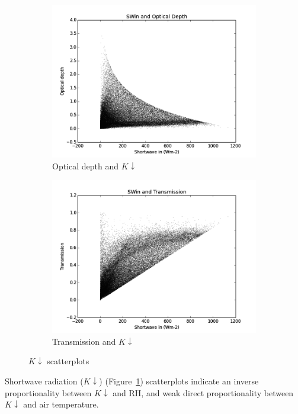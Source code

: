 \documentclass[a4paper,titlepage, twoside]{report}
\newcommand\Kdown{K\!\!\downarrow}
\begin{document}
\begin{figure}
\begin{subfigure}{0.48\textwidth}
\includegraphics[width=\textwidth]{012_SWin_tau.png}
\caption{Optical depth and $\Kdown$}
\end{subfigure}
\hfill
\begin{subfigure}{0.48\textwidth}
\includegraphics[width=\textwidth]{013_SWin_Tr.png}
\caption{Transmission and $\Kdown$}
\end{subfigure}
\caption{$\Kdown$ scatterplots}
\label{fig:data-3}
\end{figure}

Shortwave radiation ($\Kdown$) (Figure~\ref{fig:data-3}) scatterplots indicate an inverse proportionality between $\Kdown$ and $\mathrm{RH}$, and weak direct proportionality between $\Kdown$ and air temperature. 
\end{document}
